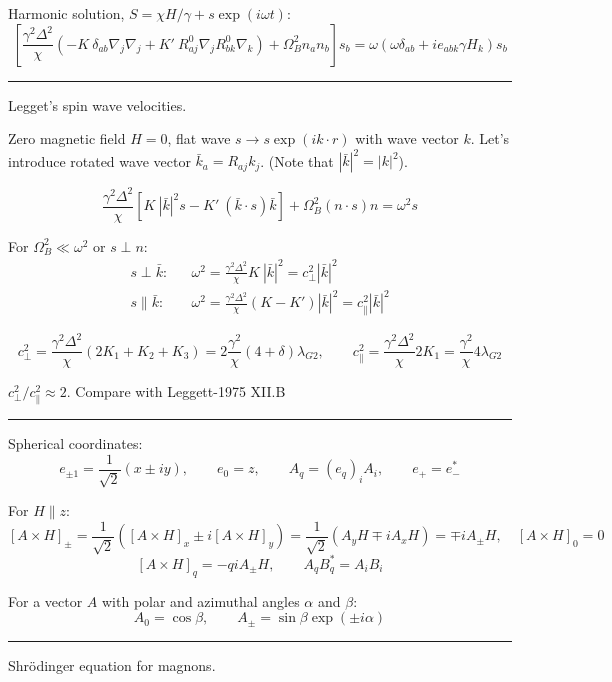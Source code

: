 \documentclass[a4paper]{article}
\begin{document}
Harmonic solution, $S = \chi H/\gamma + s \exp(i\omega t)$:
$$
\left[
\frac{\gamma^2\Delta^2}{\chi}
  (-K\ \delta_{ab} \nabla_j\nabla_j
 + K'\ R^0_{aj}\nabla_j R^0_{bk}\nabla_k)
+ {\Omega_B^2} n_a n_b
\right] s_b =
\omega (\omega \delta_{ab} + i e_{abk} \gamma H_k ) s_b
$$

\eject
\hrule
\medskip

Legget's spin wave velocities.

Zero magnetic field $H=0$, flat wave $s\rightarrow s\exp(i k\cdot r)$ with
wave vector $k$.
Let's introduce rotated wave vector $\bar k_a = R_{aj} k_j$. (Note that
$|\bar k|^2 = |k|^2$).

$$
\frac{\gamma^2\Delta^2}{\chi}
  [K\ |\bar k|^2 s - K'\ (\bar k \cdot s)\bar k]
+ \Omega_B^2 (n\cdot s)n
= \omega^2 s
$$

For $\Omega_B^2 \ll \omega^2$ or $s \perp n$:
\begin{eqnarray*}
s \perp \bar k:
&&
\omega^2
= \frac{\gamma^2\Delta^2}{\chi} K\ |\bar k|^2
= c_\perp^2 |\bar k|^2
\\
s \parallel \bar k:
&&
\omega^2
= \frac{\gamma^2\Delta^2}{\chi}(K - K')|\bar k|^2
= c_\parallel^2 |\bar k|^2
\end{eqnarray*}

$$
c_\perp^2 = \frac{\gamma^2\Delta^2}{\chi} (2K_1+K_2+K_3)
= 2\frac{\gamma^2}{\chi} (4+\delta)\lambda_{G2},
\qquad
c_\parallel^2 = \frac{\gamma^2\Delta^2}{\chi} 2K_1
= \frac{\gamma^2}{\chi} 4\lambda_{G2}
$$

$ c_\perp^2/c_\parallel^2 \approx 2$.
Compare with Leggett-1975 XII.B

\bigskip
\hrule
\medskip

Spherical coordinates:
$$
e_{\pm1} = \frac{1}{\sqrt2} (x\pm iy),\qquad
e_0 = z,\qquad
A_q = (e_q)_i A_i,\qquad
e_+ = e_-^*
$$

For $H \parallel z$:
$$
[A \times H]_{\pm} = \frac{1}{\sqrt2}([A\times H]_x \pm i[A\times H]_y) =
\frac{1}{\sqrt2}(A_y H \mp i A_x H) = \mp i A_{\pm} H,\quad [A \times H]_0=0
$$
$$
[A \times H]_q = -q i A_{\pm} H,\qquad
A_q B^*_{q} = A_i B_i
$$

For a vector $A$ with polar and azimuthal angles $\alpha$ and $\beta$:
$$
A_0 = \cos\beta,\qquad
A_\pm = \sin\beta\exp(\pm i\alpha)
$$

\eject
\hrule
\medskip

Shr\"odinger equation for magnons.
\end{document}
